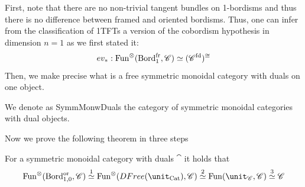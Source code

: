  First, note that there are no non-trivial tangent bundles on 1-bordisms and thus there is no difference between 
 framed and oriented bordisms. Thus, one can infer from the classification of 1TFTs a version of the cobordism 
 hypothesis in dimension $n=1$ as we first stated it:
 $$ev_{\ast}:\operatorname{Fun}^{\otimes}(\operatorname{Bord}_{1}^{\operatorname{fr}},\mathscr{C})\simeq (\mathscr{C}^{\operatorname{fd}})^{\cong}$$
  Then, we make precise what is a free symmetric monoidal category with duals on one object.
\begin{notat}
We denote as SymmMonwDuals the category of symmetric monoidal categories with dual objects.
\end{notat}
Now we prove the following theorem in three steps
\begin{thm}
	For a symmetric monoidal category with duals $\cat$ it holds that
	$$\Fun^{\otimes}(\Bord_{1,0}^{\operatorname{or}},\cat)\overset{1}{\simeq}\Fun^{\otimes}(DFree(\unit_{\Cat}),\cat)\overset{2}{\simeq}\Fun(\unit_\cat,\cat)\overset{3}{\simeq} \cat$$
\end{thm}
